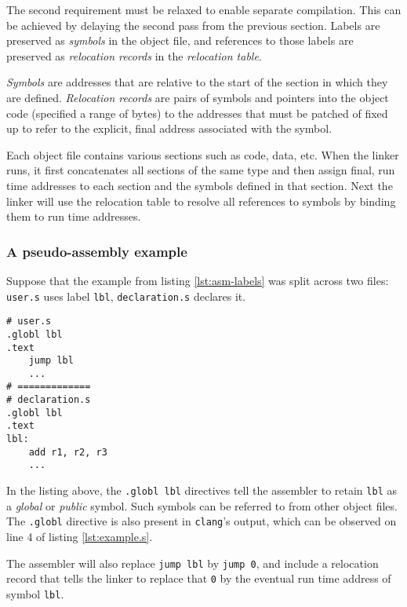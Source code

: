 \documentclass[12pt,a4paper]{article}
\newcommand{\clang}{\texttt{clang}}
\newcommand{\CC}{\clang{}}
\newcommand{\labelname}[1]{\texttt{#1}}
\newcommand{\filename}[1]{\texttt{#1}}
\begin{document}
The second requirement must be relaxed to enable separate compilation. This can be achieved by delaying the second pass from the previous section. Labels are preserved as \emph{symbols} in the object file, and references to those labels are preserved as \emph{relocation records} in the \emph{relocation table}. 

\emph{Symbols} are addresses that are relative to the start of the section in which they are defined. \emph{Relocation records} are pairs of symbols and pointers into the object code (specified a range of bytes) to the addresses that must be patched of fixed up to refer to the explicit, final address associated with the symbol. 

Each object file contains various sections such as code, data, etc. When the linker runs, it first concatenates all sections of the same type and then assign final, run time addresses to each section and the symbols defined in that section. Next the linker will use the relocation table to resolve all references to symbols by binding them to run time addresses.

\subsubsection{A pseudo-assembly example}

Suppose that the example from listing \ref{lst:asm-labels} was split across two files: \filename{user.s} uses label \labelname{lbl}, \filename{declaration.s} declares it.\\

\begin{lstlisting}[caption=separately assembled pseudo-assembly example,label=lst:asm-symbols]
# user.s
.globl lbl
.text
    jump lbl
    ...
# =============
# declaration.s
.globl lbl
.text
lbl: 
    add r1, r2, r3
    ...
\end{lstlisting}

In the listing above, the \texttt{.globl lbl} directives tell the assembler to retain \labelname{lbl} as a  \emph{global} or \emph{public} symbol. Such symbols can be referred to from other object files. The \texttt{.globl} directive is also present in \CC{}'s output, which can be observed on line 4 of listing \ref{lst:example.s}.

The assembler will also replace \texttt{jump lbl} by \texttt{jump 0}, and include a relocation record that tells the linker to replace that \texttt{0} by the eventual run time address of symbol \labelname{lbl}. 
\end{document}
